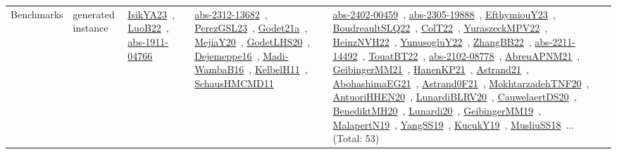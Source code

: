 {\begin{longtable}{lp{3cm}>{\raggedright\arraybackslash}p{6cm}>{\raggedright\arraybackslash}p{6cm}>{\raggedright\arraybackslash}p{8cm}}
Benchmarks & generated instance & \href{works/IsikYA23.pdf}{IsikYA23}~\cite{IsikYA23}, \href{works/LuoB22.pdf}{LuoB22}~\cite{LuoB22}, \href{works/abs-1911-04766.pdf}{abs-1911-04766}~\cite{abs-1911-04766} & \href{works/abs-2312-13682.pdf}{abs-2312-13682}~\cite{abs-2312-13682}, \href{works/PerezGSL23.pdf}{PerezGSL23}~\cite{PerezGSL23}, \href{works/Godet21a.pdf}{Godet21a}~\cite{Godet21a}, \href{works/MejiaY20.pdf}{MejiaY20}~\cite{MejiaY20}, \href{works/GodetLHS20.pdf}{GodetLHS20}~\cite{GodetLHS20}, \href{works/Dejemeppe16.pdf}{Dejemeppe16}~\cite{Dejemeppe16}, \href{works/Madi-WambaB16.pdf}{Madi-WambaB16}~\cite{Madi-WambaB16}, \href{works/KelbelH11.pdf}{KelbelH11}~\cite{KelbelH11}, \href{works/SchausHMCMD11.pdf}{SchausHMCMD11}~\cite{SchausHMCMD11} & \href{works/abs-2402-00459.pdf}{abs-2402-00459}~\cite{abs-2402-00459}, \href{works/abs-2305-19888.pdf}{abs-2305-19888}~\cite{abs-2305-19888}, \href{works/EfthymiouY23.pdf}{EfthymiouY23}~\cite{EfthymiouY23}, \href{works/BoudreaultSLQ22.pdf}{BoudreaultSLQ22}~\cite{BoudreaultSLQ22}, \href{works/ColT22.pdf}{ColT22}~\cite{ColT22}, \href{works/YuraszeckMPV22.pdf}{YuraszeckMPV22}~\cite{YuraszeckMPV22}, \href{works/HeinzNVH22.pdf}{HeinzNVH22}~\cite{HeinzNVH22}, \href{works/YunusogluY22.pdf}{YunusogluY22}~\cite{YunusogluY22}, \href{works/ZhangBB22.pdf}{ZhangBB22}~\cite{ZhangBB22}, \href{works/abs-2211-14492.pdf}{abs-2211-14492}~\cite{abs-2211-14492}, \href{works/TouatBT22.pdf}{TouatBT22}~\cite{TouatBT22}, \href{works/abs-2102-08778.pdf}{abs-2102-08778}~\cite{abs-2102-08778}, \href{works/AbreuAPNM21.pdf}{AbreuAPNM21}~\cite{AbreuAPNM21}, \href{works/GeibingerMM21.pdf}{GeibingerMM21}~\cite{GeibingerMM21}, \href{works/HanenKP21.pdf}{HanenKP21}~\cite{HanenKP21}, \href{works/Astrand21.pdf}{Astrand21}~\cite{Astrand21}, \href{works/AbohashimaEG21.pdf}{AbohashimaEG21}~\cite{AbohashimaEG21}, \href{works/Astrand0F21.pdf}{Astrand0F21}~\cite{Astrand0F21}, \href{works/MokhtarzadehTNF20.pdf}{MokhtarzadehTNF20}~\cite{MokhtarzadehTNF20}, \href{works/AntuoriHHEN20.pdf}{AntuoriHHEN20}~\cite{AntuoriHHEN20}, \href{works/LunardiBLRV20.pdf}{LunardiBLRV20}~\cite{LunardiBLRV20}, \href{works/CauwelaertDS20.pdf}{CauwelaertDS20}~\cite{CauwelaertDS20}, \href{works/BenediktMH20.pdf}{BenediktMH20}~\cite{BenediktMH20}, \href{works/Lunardi20.pdf}{Lunardi20}~\cite{Lunardi20}, \href{works/GeibingerMM19.pdf}{GeibingerMM19}~\cite{GeibingerMM19}, \href{works/MalapertN19.pdf}{MalapertN19}~\cite{MalapertN19}, \href{works/YangSS19.pdf}{YangSS19}~\cite{YangSS19}, \href{works/KucukY19.pdf}{KucukY19}~\cite{KucukY19}, \href{works/MusliuSS18.pdf}{MusliuSS18}~\cite{MusliuSS18}... (Total: 53)\\

\end{longtable}}
